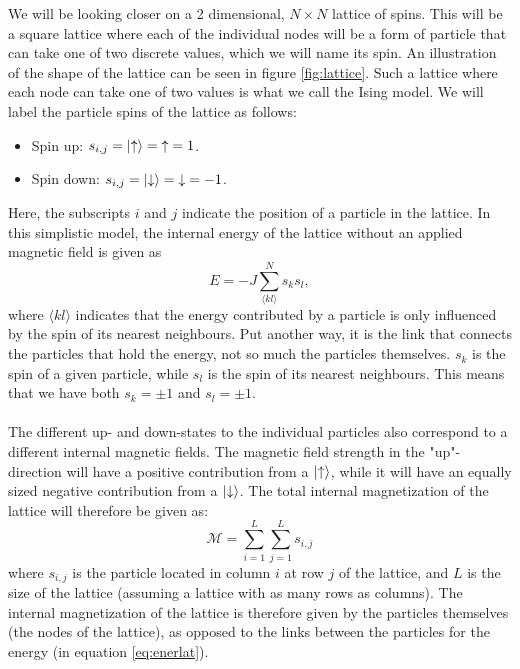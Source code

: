 \documentclass[reprint,english,notitlepage]{revtex4-1}  %
\begin{document}
We will be looking closer on a 2 dimensional, $N\times N$ lattice of spins. This will be a square lattice where each of the individual nodes will be a form of particle that can take one of two discrete values, which we will name its spin. An illustration of the shape of the lattice can be seen in figure \ref{fig:lattice}. Such a lattice where each node can take one of two values is what we call the Ising model. We will label the particle spins of the lattice as follows:
\begin{itemize}
    \item Spin up: $s_{i,j} = \ket{\uparrow}  =\;  \uparrow \; = 1$.
    \item Spin down: $s_{i,j} = \ket{\downarrow} =\; \downarrow \;= -1$.
\end{itemize}
Here, the subscripts $i$ and $j$ indicate the position of a particle in the lattice. In this simplistic model, the internal energy of the lattice without an applied magnetic field is given as
\begin{equation}\label{eq:enerlat}
E = -J\sum\limits_{\langle kl\rangle}^N s_ks_l,
\end{equation}
where $\langle kl\rangle$ indicates that the energy contributed by a particle is only influenced by the spin of its nearest neighbours. Put another way, it is the link that connects the particles that hold the energy, not so much the particles themselves. $s_k$ is the spin of a given particle, while $s_l$ is the spin of its nearest neighbours. This means that we have both $s_k = \pm 1$ and $s_l = \pm 1$.
\\
\\
The different up- and down-states to the individual particles also correspond to a different internal magnetic fields. The magnetic field strength in the "up"-direction will have a positive contribution from a $\ket{\uparrow}$, while it will have an equally sized negative contribution from a $\ket{\downarrow}$. The total internal magnetization of the lattice will therefore be given as:
\begin{equation}\label{eq:magneticlat}
    \mathcal{M} = \sum\limits_{i=1}^L\sum\limits_{j=1}^L s_{i,j}
\end{equation}
where $s_{i,j}$ is the particle located in column $i$ at row $j$ of the lattice, and $L$ is the size of the lattice (assuming a lattice with as many rows as columns). The internal magnetization of the lattice is therefore given by the particles themselves (the nodes of the lattice), as opposed to the links between the particles for the energy (in equation \ref{eq:enerlat}).
\end{document}
